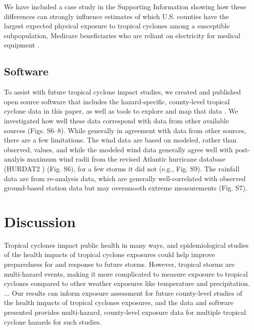 \documentclass[fleqn,10pt,lineno]{olplainarticle}
\begin{document}
We have included a case study in the Supporting Information showing how these
differences can strongly influence estimates of which U.S. counties have the
largest expected physical exposure to tropical cyclones among a susceptible
subpopulation, Medicare beneficiaries who are reliant on electricity for
medical equipment \citep{empower}.

\subsection*{Software}

To assist with future tropical cyclone impact studies, we created and published
open source software that includes the hazard-specific, county-level tropical
cyclone data in this paper, as well as tools to explore and map that data
\citep{hurricaneexposure, hurricaneexposuredata}.  We investigated how well
these data correspond with data from other available sources (Figs. S6--8).
While generally in agreement with data from other sources, there are a few
limitations. The wind data are based on modeled, rather than observed, values,
and while the modeled wind data generally agree well with post-analyis maximum
wind radii from the revised Atlantic hurricane database (HURDAT2
\citep{landsea2013}) (Fig. S6), for a few storms it did not (e.g., Fig.  S9).
The rainfall data are from re-analysis data, which are generally
well-correlated with observed ground-based station data but may oversmooth
extreme measurements (Fig. S7).  

\section*{Discussion}

Tropical cyclones impact public health in many ways, and epidemiological studies
of the health impacts of tropical cyclone exposures could help improve
preparedness for and response to future storms. However, tropical storms are
multi-hazard events, making it more complicated to measure exposure to tropical
cyclones compared to other weather exposures like temperature and precipitation.
... Our results can inform exposure assessment for future county-level studies
of the health impacts of tropical cyclones exposures, and the data and software
presented provides multi-hazard, county-level exposure data for multiple
tropical cyclone hazards for such studies.
\end{document}
